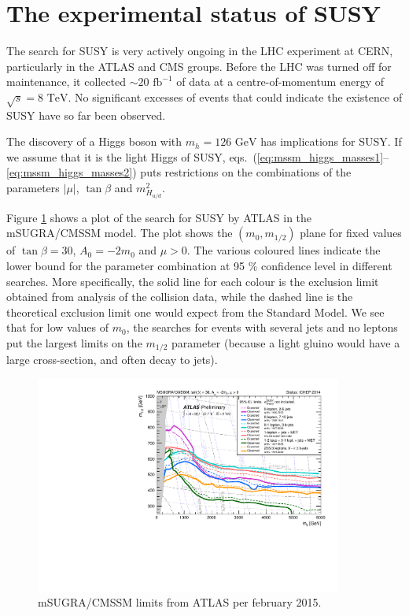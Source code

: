 \documentclass[twoside,english]{uiofysmaster}
\begin{document}



\section{The experimental status of SUSY}

The search for SUSY is very actively ongoing in the LHC experiment at CERN, particularly in the ATLAS and CMS groups. Before the LHC was turned off for maintenance, it collected $\sim 20 \,\, \mathrm{fb}^{-1}$ of data at a centre-of-momentum energy of $\sqrt{s} = 8\,\,\mathrm{TeV}$. No significant excesses of events that could indicate the existence of SUSY have so far been observed. 

The discovery of a Higgs boson with $m_h = 126 \,\,\mathrm{GeV}$ has implications for SUSY. If we assume that it is the light Higgs of SUSY, eqs.\ (\ref{eq:mssm_higgs_masses1}--\ref{eq:mssm_higgs_masses2}) puts restrictions on the combinations of the parameters $|\mu|$, $\tan\beta$ and $m^2_{H_{u/d}}$.

Figure \ref{fig:ATLAS_mSUGRA} shows a plot of the search for SUSY by ATLAS in the mSUGRA/CMSSM model. The plot shows the $(m_0,m_{1/2})$ plane for fixed values of $\tan\beta = 30$, $A_0 = -2m_0$ and $\mu>0$. The various coloured lines indicate the lower bound for the parameter combination at 95 \% confidence level in different searches. More specifically, the solid line for each colour is the exclusion limit obtained from analysis of the collision data, while the dashed line is the theoretical exclusion limit one would expect from the Standard Model. We see that for low values of $m_0$, the searches for events with several jets and no leptons put the largest limits on the $m_{1/2}$ parameter (because a light gluino would have a large cross-section, and often decay to jets).
\begin{figure}[hbt]
	\centering
	\includegraphics[width=0.9\textwidth]{figures/susyintro/ATLAS_SUSY_MSUGRA.pdf}
	\caption{mSUGRA/CMSSM limits from ATLAS per february 2015. }
	\label{fig:ATLAS_mSUGRA}
\end{figure}
\end{document}
